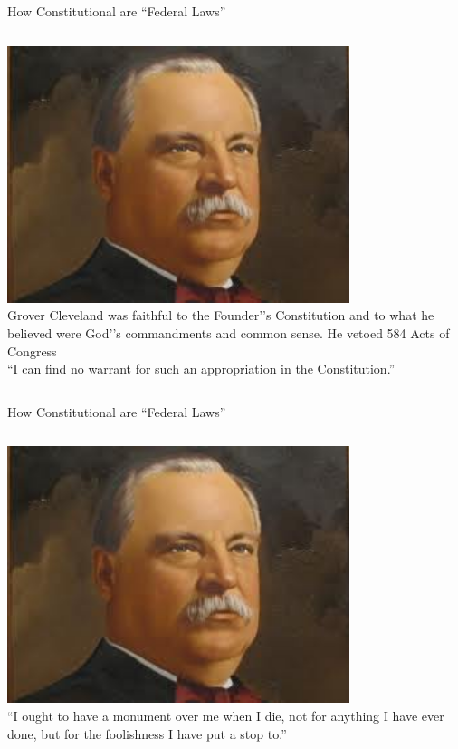 \begin{frame}{How Constitutional are ``Federal Laws''}
    \begin{columns}[onlytextwidth]
            \centering
            \includegraphics[width=0.75\textwidth]{img/cleveland2.png} \\

            Grover Cleveland was faithful to the Founder'’s Constitution and to
            what he believed were God'’s commandments and common sense.  He
            vetoed 584 Acts of Congress \\
            \pause
            \vspace{15pt}
            ``I can find no warrant for such an appropriation in the Constitution.'' \\

    \end{columns}
\end{frame}

\begin{frame}{How Constitutional are ``Federal Laws''}
    \begin{columns}[onlytextwidth]
            \centering
            \includegraphics[width=0.75\textwidth]{img/cleveland2.png} \\

            ``I ought to have a monument over me when I die, not for anything I have ever done, but for the foolishness I have put a stop to.''

    \end{columns}
\end{frame}

